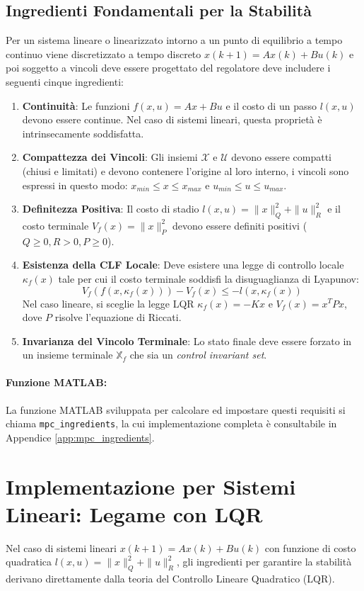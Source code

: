 \subsection{Ingredienti Fondamentali per la Stabilità}
Per un sistema lineare o linearizzato intorno a un punto di equilibrio a tempo continuo viene discretizzato a tempo discreto $x(k+1) = Ax(k) + Bu(k)$ e poi soggetto a vincoli deve essere progettato del regolatore deve includere i seguenti cinque ingredienti:
\begin{enumerate}
	\item \textbf{Continuità}: Le funzioni $f(x,u) = Ax+Bu$ e il costo di un passo $l(x,u)$ devono essere continue. Nel caso  di sistemi lineari, questa proprietà è intrinsecamente soddisfatta.
	\item \textbf{Compattezza dei Vincoli}: Gli insiemi $\mathcal{X}$ e $\mathcal{U}$ devono essere compatti (chiusi e limitati) e devono contenere l'origine al loro interno, i vincoli sono espressi in questo modo: $x_{min} \le x \le x_{max}$ e $u_{min} \le u \le u_{max}$.
	\item \textbf{Definitezza Positiva}: Il costo di stadio $l(x,u) = \|x\|_Q^2 + \|u\|_R^2$ e il costo terminale $V_f(x) = \|x\|_P^2$ devono essere definiti positivi ($Q \ge 0, R > 0, P \ge 0$).
	\item \textbf{Esistenza della CLF Locale}: Deve esistere una legge di controllo locale $\kappa_f(x)$ tale per cui il costo terminale soddisfi la disuguaglianza di Lyapunov:
	\begin{equation}
		V_f(f(x, \kappa_f(x))) - V_f(x) \le -l(x, \kappa_f(x))
	\end{equation}
	Nel caso lineare, si sceglie la legge LQR $\kappa_f(x) = -Kx$ e $V_f(x) = x^T P x$, dove $P$ risolve l'equazione di Riccati.
	
	\item \textbf{Invarianza del Vincolo Terminale}: Lo stato finale deve essere forzato in un insieme terminale $\mathbb{X}_f$ che sia un \textit{control invariant set}.
\end{enumerate}

\paragraph{Funzione MATLAB:}
La funzione MATLAB sviluppata per calcolare ed impostare questi requisiti si chiama \texttt{mpc\_ingredients}, la cui implementazione completa è consultabile in Appendice \ref{app:mpc_ingredients}.

\section{Implementazione per Sistemi Lineari: Legame con LQR}
\label{cap:12.5}
Nel caso di sistemi lineari $x(k+1) = Ax(k) + Bu(k)$ con funzione di costo quadratica $l(x,u) = \|x\|_Q^2 + \|u\|_R^2$, gli ingredienti per garantire la stabilità derivano direttamente dalla teoria del Controllo Lineare Quadratico (LQR).

